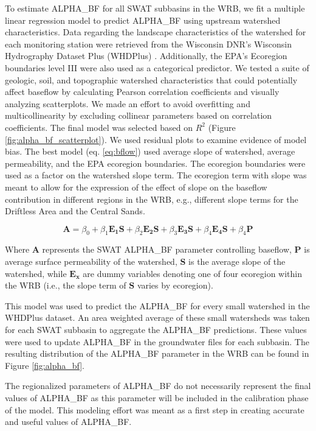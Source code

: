 	To estimate ALPHA\_BF for all SWAT subbasins in the WRB, we fit a multiple linear regression model to predict ALPHA\_BF using upstream watershed characteristics. Data regarding the landscape characteristics of the watershed for each monitoring station were retrieved from the Wisconsin DNR's Wisconsin Hydrography Dataset Plus (WHDPlus) \citep{wdnr_whdplus_2013}. Additionally, the EPA's Ecoregion boundaries level III were also used as a categorical predictor. We tested a suite of geologic, soil, and topographic watershed characteristics that could potentially affect baseflow by calculating Pearson correlation coefficients and visually analyzing scatterplots. We made an effort to avoid overfitting and multicollinearity by excluding collinear parameters based on correlation coefficients. The final model was selected based on $R^2$ (Figure \ref{fig:alpha_bf_scatterplot}). We used residual plots to examine evidence of model bias. The best model (eq. \ref{eq:bflow}) used average slope of watershed, average permeability, and the EPA ecoregion boundaries. The ecoregion boundaries were used as a factor on the watershed slope term. The ecoregion term with slope was meant to allow for the expression of the effect of slope on the baseflow contribution in different regions in the WRB, e.g., different slope terms for the Driftless Area and the Central Sands.

	\begin{equation}
	\bm{A} = \beta_0 + 
		\beta_1 \bm{E_1} \bm{S} +
		\beta_2 \bm{E_2} \bm{S} + 
		\beta_3 \bm{E_3} \bm{S} +
		\beta_4 \bm{E_4} \bm{S} +
		\beta_4 \bm{P}
		\label{eq:bflow}
	\end{equation}
	
	Where $\bm{A}$ represents the SWAT ALPHA\_BF parameter controlling baseflow, $\bm{P}$ is average surface permeability of the watershed, $\bm{S}$ is the average slope of the watershed, while $\bm{E_x}$ are dummy variables denoting one of four ecoregion within the WRB (i.e., the slope term of $\bm{S}$ varies by ecoregion).
	
	This model was used to predict the ALPHA\_BF for every small watershed in the WHDPlus dataset. An area weighted average of these small watersheds was taken for each SWAT subbasin to aggregate the ALPHA\_BF predictions. These values were used to update ALPHA\_BF in the groundwater files for each subbasin. The resulting distribution of the ALPHA\_BF parameter in the WRB can be found in Figure \ref{fig:alpha_bf}.
	
	The regionalized parameters of ALPHA\_BF do not necessarily represent the final values of ALPHA\_BF as this parameter will be included in the calibration phase of the model. This modeling effort was meant as a first step in creating accurate and useful values of ALPHA\_BF.
